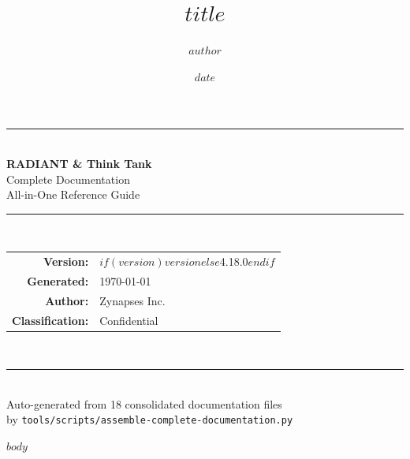 \documentclass[$if(fontsize)$$fontsize$,$endif$]{report}
\title{\color{radiantblue}\textbf{$title$}}
\author{$author$}
\date{$date$}
\begin{document}
\begin{titlepage}
\centering
\vspace*{3cm}
{\color{radiantblue}\rule{\textwidth}{2pt}}\\[1.5cm]
{\Huge\bfseries\color{radiantblue} RADIANT \& Think Tank\\[0.5cm]}
{\LARGE Complete Documentation\\[0.3cm]}
{\large\color{textgray} All-in-One Reference Guide\\[2cm]}
{\color{radiantblue}\rule{\textwidth}{0.5pt}}\\[1cm]
{\large\color{textgray}
\begin{tabular}{rl}
\textbf{Version:} & $if(version)$$version$$else$4.18.0$endif$ \\[4pt]
\textbf{Generated:} & \today \\[4pt]
\textbf{Author:} & Zynapses Inc. \\[4pt]
\textbf{Classification:} & Confidential \\
\end{tabular}
}\\[2cm]
{\color{radiantblue}\rule{\textwidth}{2pt}}\\[1cm]
{\small\color{lightgray} Auto-generated from 18 consolidated documentation files\\
by \texttt{tools/scripts/assemble-complete-documentation.py}}
\vfill
\end{titlepage}

{
\hypersetup{linkcolor=black}
\tableofcontents
}
\clearpage

$body$
\end{document}
